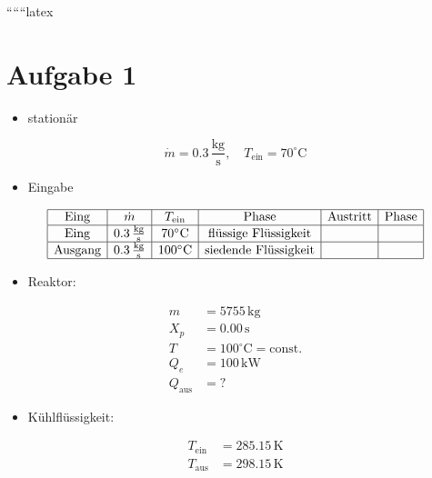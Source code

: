 
``````latex


\section*{Aufgabe 1}

\begin{itemize}
    \item stationär
\end{itemize}

\[
\dot{m} = 0.3 \, \frac{\text{kg}}{\text{s}}, \quad T_{\text{ein}} = 70^\circ \text{C}
\]

\begin{itemize}
    \item Eingabe
\end{itemize}

\[
\begin{array}{|c|c|c|c|c|c|}
\hline
\text{Eing} & \dot{m} & T_{\text{ein}} & \text{Phase} & \text{Austritt} & \text{Phase} \\
\hline
\text{Eing} & 0.3 \, \frac{\text{kg}}{\text{s}} & 70^\circ \text{C} & \text{flüssige Flüssigkeit} & & \\
\hline
\text{Ausgang} & 0.3 \, \frac{\text{kg}}{\text{s}} & 100^\circ \text{C} & \text{siedende Flüssigkeit} & & \\
\hline
\end{array}
\]

\begin{itemize}
    \item Reaktor:
\end{itemize}

\[
\begin{aligned}
    m &= 5755 \, \text{kg} \\
    X_p &= 0.00 \, \text{s} \\
    T &= 100^\circ \text{C} = \text{const.} \\
    Q_e &= 100 \, \text{kW} \\
    Q_{\text{aus}} &= ?
\end{aligned}
\]

\begin{itemize}
    \item Kühlflüssigkeit:
\end{itemize}

\[
\begin{aligned}
    T_{\text{ein}} &= 285.15 \, \text{K} \\
    T_{\text{aus}} &= 298.15 \, \text{K}
\end{aligned}
\]

